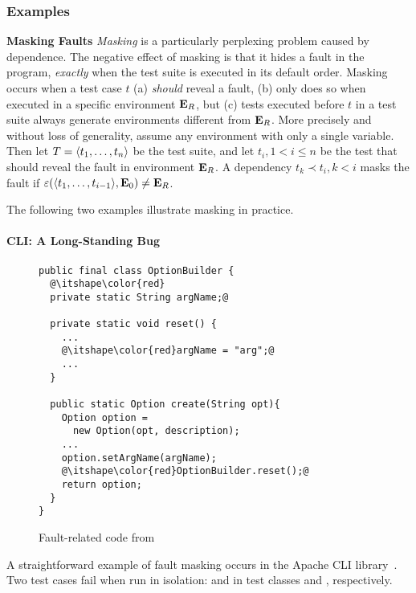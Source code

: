 \subsubsection{Examples}

\noindent \textbf{Masking Faults}
\emph{Masking} is a particularly perplexing problem caused by
dependence.
The negative effect of masking is that it hides a fault in the
program, \emph{exactly} when the test suite is executed in its default
order. 
Masking occurs when a test case $t$ (a) \emph{should}
reveal a fault, (b) only does so when executed in a specific environment
$\mathbf{E}_R$, but (c) tests executed before $t$ in a test suite always
generate environments different from
$\mathbf{E}_R$.
More precisely and without loss of generality, assume any
environment with only a single variable. Then let $T =
 \langle t_1,\dots,t_n \rangle $ be the test suite, and let $t_i, 1 < i \leq n$
be the test that should reveal the fault in environment $\mathbf{E}_R$. A
dependency $t_k \prec t_i, k < i$ masks the fault if
$\varepsilon( \langle t_1,\dots,t_{i-1} \rangle ,\mathbf{E}_0) \neq \mathbf{E}_R$.

The following two examples illustrate masking in
practice.

\paragraph{CLI: A Long-Standing Bug}

\begin{figure}
\begin{lstlisting}
public final class OptionBuilder {
  @\itshape\color{red}
  private static String argName;@
  
  private static void reset() {
    ...
    @\itshape\color{red}argName = "arg";@
    ...
  }
   
  public static Option create(String opt){
    Option option = 
      new Option(opt, description);
    ...
    option.setArgName(argName);
    @\itshape\color{red}OptionBuilder.reset();@
    return option;
  }
}
\end{lstlisting}
\caption{Fault-related code from }
\label{fig:option_builder}
\end{figure}

A straightforward example of fault masking occurs in the Apache CLI
library~\cite{cli}.
Two test cases fail when run in isolation:
 and  in test
classes  and ,
respectively.

